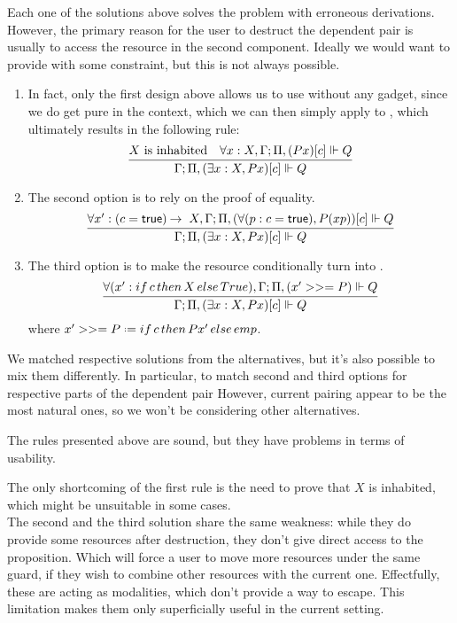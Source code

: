 Each one of the solutions above solves the problem with erroneous derivations.
However, the primary reason for the user to destruct the dependent pair is usually to access the resource in the second component.
Ideally we would want to provide  with some constraint, but this is not always possible.

\begin{enumerate}
\item In fact, only the first design above allows us to use  without any gadget, since we do get pure  in the context, which we can then simply apply to , which ultimately results in the following rule:
  \[
    \infer{\entails {\IntuD} {\SpatD, (\exists x : X, P x)[c]} {Q}}
          {X \text{ is inhabited} &
           \forall x : X , \entails {\IntuD} {\SpatD, (P x)[c]} {Q}}
  \]
\item The second option is to rely on the proof of equality.
    \[
    \infer{\entails {\IntuD} {\SpatD, (\exists x : X, P x)[c]} {Q}}
          {\forall x' : (c = \true) \imp X , \entails {\IntuD} {\SpatD, (\forall (p : c = \true), P (x p))[c]} {Q}}
    \]
\item The third option is to make the resource conditionally turn into \emp.
   \[
    \infer{\entails {\IntuD} {\SpatD, (\exists x : X, P x)[c]} {Q}}
          {\forall (x' : \mathop{if} c \mathop{then} X \mathop{else} True), \entails {\IntuD} {\SpatD, (x' >>= P)} {Q}}
   \]
   where \(x' >>= P \defeq \mathop{if} c \mathop{then} P x' \mathop{else} emp\).
\end{enumerate}

We matched respective solutions from the alternatives, but it's also possible to mix them differently.
In particular, to match second and third options for respective parts of the dependent pair
However, current pairing appear to be the most natural ones, so we won't be considering other alternatives.

The rules presented above are sound, but they have problems in terms of usability.

The only shortcoming of the first rule is the need to prove that \(X\) is inhabited, which might be unsuitable in some cases.\\
The second and the third solution share the same weakness: while they do provide some resources after destruction, they don't give direct access to the proposition.
Which will force a user to move more resources under the same guard, if they wish to combine other resources with the current one.
Effectfully, these are acting as modalities, which don't provide a way to escape.
This limitation makes them only superficially useful in the current setting.

